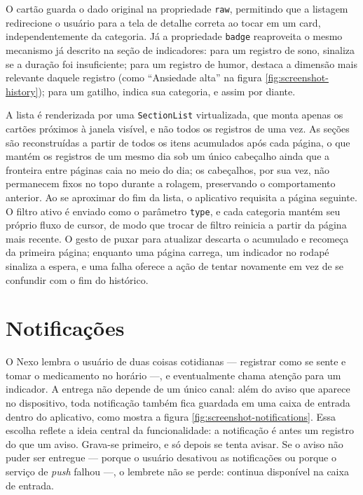 O cartão guarda o dado original na propriedade \texttt{raw}, permitindo
que a listagem redirecione o usuário para a tela de detalhe correta ao
tocar em um card, independentemente da categoria. Já a propriedade
\texttt{badge} reaproveita o mesmo mecanismo já descrito na seção de
indicadores: para um registro de sono, sinaliza se a duração foi
insuficiente; para um registro de humor, destaca a dimensão mais relevante
daquele registro (como ``Ansiedade alta'' na
figura \ref{fig:screenshot-history}); para um gatilho, indica sua
categoria, e assim por diante.

A lista é renderizada por uma \texttt{SectionList} virtualizada, que
monta apenas os cartões próximos à janela visível, e não todos os
registros de uma vez. As seções são reconstruídas a partir de todos os
itens acumulados após cada página, o que mantém os registros de um mesmo
dia sob um único cabeçalho ainda que a fronteira entre páginas caia no
meio do dia; os cabeçalhos, por sua vez, não permanecem fixos no topo
durante a rolagem, preservando o comportamento anterior. Ao se aproximar
do fim da lista, o aplicativo requisita a página seguinte. O filtro ativo
é enviado como o parâmetro \texttt{type}, e cada categoria mantém seu
próprio fluxo de cursor, de modo que trocar de filtro reinicia a partir
da página mais recente. O gesto de puxar para atualizar descarta o
acumulado e recomeça da primeira página; enquanto uma página carrega, um
indicador no rodapé sinaliza a espera, e uma falha oferece a ação de
tentar novamente em vez de se confundir com o fim do histórico.

\section{Notificações}\label{sec:notifications}

O Nexo lembra o usuário de duas coisas cotidianas --- registrar como se
sente e tomar o medicamento no horário ---, e eventualmente chama atenção
para um indicador. A entrega não depende de um único canal: além do aviso
que aparece no dispositivo, toda notificação também fica guardada em uma
caixa de entrada dentro do aplicativo, como mostra a figura
\ref{fig:screenshot-notifications}. Essa escolha reflete a ideia central da
funcionalidade: a notificação é antes um registro do que um aviso. Grava-se
primeiro, e só depois se tenta avisar. Se o aviso não puder ser entregue
--- porque o usuário desativou as notificações ou porque o serviço de
\textit{push} falhou ---, o lembrete não se perde: continua disponível na
caixa de entrada.

